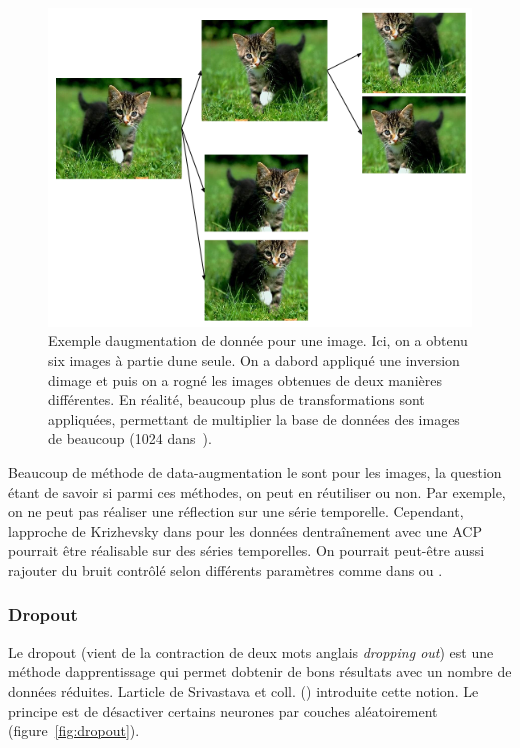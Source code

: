 \documentclass[11pt]{sdm}
\begin{document}
			\begin{figure}[!ht]
				\centering
				\includegraphics[scale=0.6,natwidth=528,natheight=397]{figures/dataAugmentationImage.png}
				\caption{Exemple d\textquotesingle augmentation de donn\'ee pour une image. Ici, on a obtenu six images \`a partie d\textquotesingle une seule. On a d\textquotesingle abord appliqu\'e une inversion d\textquotesingle image et puis on a rogn\'e les images obtenues de deux mani\`eres diff\'erentes. En r\'ealit\'e, beaucoup plus de transformations sont appliqu\'ees, permettant de multiplier la base de donn\'ees des images de beaucoup (1024 dans~\cite{howard2013some}).}
				\label{fig:dataAugmentationChat}
			\end{figure}

			Beaucoup de m\'ethode de data-augmentation le sont pour les images, la question \'etant de savoir si parmi ces m\'ethodes, on peut en r\'eutiliser ou non. Par exemple, on ne peut pas r\'ealiser une r\'eflection sur une s\'erie temporelle. Cependant, l\textquotesingle approche de Krizhevsky dans \cite{krizhevsky2012imagenet} pour les donn\'ees d\textquotesingle entra\^inement avec une ACP pourrait \^etre r\'ealisable sur des s\'eries temporelles. On pourrait peut-\^etre aussi rajouter du bruit contr\^ol\'e selon diff\'erents param\`etres comme dans \cite{krizhevsky2012imagenet} ou \cite{howard2013some}.

		\subsubsection{Dropout}
		\label{seq:dropout}
			Le dropout (vient de la contraction de deux mots anglais \textit{dropping out}) est une m\'ethode d\textquotesingle apprentissage qui permet d\textquotesingle obtenir de bons r\'esultats avec un nombre de donn\'ees r\'eduites. L\textquotesingle article de Srivastava et coll. (\cite{srivastava2014dropout}) introduite cette notion. Le principe est de d\'esactiver certains neurones par couches al\'eatoirement (figure~\ref{fig:dropout}).
\end{document}
